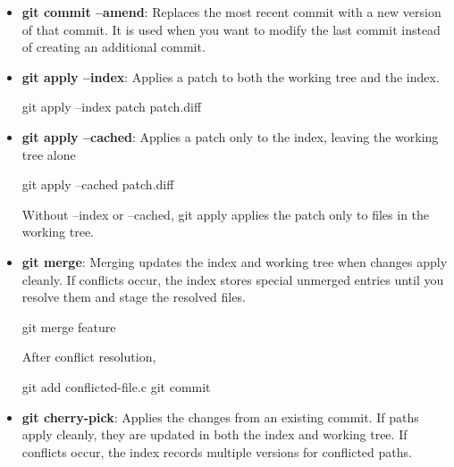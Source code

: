 \documentclass{report}
\begin{document}
\begin{itemize}
\begin{itemize}
                    \bigbreak \noindent 
                    Commits the current content of the named tracked file, bypassing the normal “only what is already staged” behavior for that file.
                \item \textbf{git commit --amend}: Replaces the most recent commit with a new version of that commit.
                    \bigbreak \noindent 
                    It is used when you want to modify the last commit instead of creating an additional commit.
                \item \textbf{git apply --index}: Applies a patch to both the working tree and the index.
                    \bigbreak \noindent 
                    \begin{bashcode}
                        git apply --index patch patch.diff
                    \end{bashcode}
                \item \textbf{git apply --cached}: Applies a patch only to the index, leaving the working tree alone
                    \bigbreak \noindent 
                    \begin{bashcode}
                        git apply --cached patch.diff
                    \end{bashcode}
                    \bigbreak \noindent 
                    Without --index or --cached, git apply applies the patch only to files in the working tree.
                \item \textbf{git merge}: Merging updates the index and working tree when changes apply cleanly. If conflicts occur, the index stores special unmerged entries until you resolve them and stage the resolved files.
                    \bigbreak \noindent 
                    \begin{bashcode}
                        git merge feature
                    \end{bashcode}
                    \bigbreak \noindent 
                    After conflict resolution,
                    \bigbreak \noindent 
                    \begin{bashcode}
                        git add conflicted-file.c
                        git commit
                    \end{bashcode}
                \item \textbf{git cherry-pick}: Applies the changes from an existing commit. If paths apply cleanly, they are updated in both the index and working tree. If conflicts occur, the index records multiple versions for conflicted paths.

\end{itemize}
\end{itemize}
\end{document}
